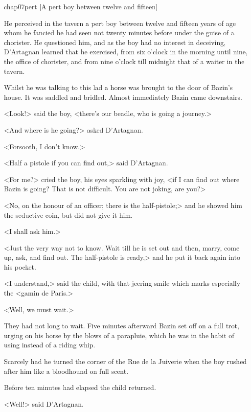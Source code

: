 \begin{bwbigpic}
	[\basicscale] 
	{chap07pert}
	[A pert boy between twelve and fifteen]
\end{bwbigpic}

He perceived in the tavern a pert boy between twelve and fifteen years of age whom he fancied he had seen not twenty minutes before under the guise of a chorister. He questioned him, and as the boy had no interest in deceiving, D'Artagnan learned that he exercised, from six o'clock in the morning until nine, the office of chorister, and from nine o'clock till midnight that of a waiter in the tavern.

Whilst he was talking to this lad a horse was brought to the door of Bazin's house. It was saddled and bridled. Almost immediately Bazin came downstairs.

<Look!> said the boy, <there's our beadle, who is going a journey.>

<And where is he going?> asked D'Artagnan.

<Forsooth, I don't know.>

<Half a pistole if you can find out,> said D'Artagnan.

<For me?> cried the boy, his eyes sparkling with joy, <if I can find out where Bazin is going? That is not difficult. You are not joking, are you?>

<No, on the honour of an officer; there is the half-pistole;> and he showed him the seductive coin, but did not give it him.

<I shall ask him.>

<Just the very way not to know. Wait till he is set out and then, marry, come up, ask, and find out. The half-pistole is ready,> and he put it back again into his pocket.

<I understand,> said the child, with that jeering smile which marks especially the <gamin de Paris.> 

<Well, we must wait.>

They had not long to wait. Five minutes afterward Bazin set off on a full trot, urging on his horse by the blows of a parapluie, which he was in the habit of using instead of a riding whip.

Scarcely had he turned the corner of the Rue de la Juiverie when the boy rushed after him like a bloodhound on full scent.

Before ten minutes had elapsed the child returned.

<Well!> said D'Artagnan.

